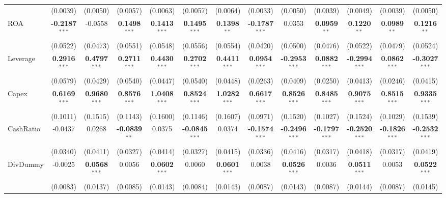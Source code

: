 \documentclass[11pt,a4paper]{article}
\begin{document}
\begin{table}[htbp]
\begin{tabular}{lcccccccccccc}
 & (0.0039) & (0.0050) & (0.0057) & (0.0063) & (0.0057) & (0.0064) & (0.0033) & (0.0050) & (0.0039) & (0.0049) & (0.0039) & (0.0050) \\
ROA & \textbf{-0.2187}$^{***}$ & -0.0558 & \textbf{0.1498}$^{***}$ & \textbf{0.1413}$^{***}$ & \textbf{0.1495}$^{***}$ & \textbf{0.1398}$^{**}$ & \textbf{-0.1787}$^{***}$ & 0.0353 & \textbf{0.0959}$^{**}$ & \textbf{0.1220}$^{**}$ & \textbf{0.0989}$^{**}$ & \textbf{0.1216}$^{**}$ \\
 & (0.0522) & (0.0473) & (0.0551) & (0.0548) & (0.0556) & (0.0554) & (0.0420) & (0.0500) & (0.0476) & (0.0522) & (0.0479) & (0.0524) \\
Leverage & \textbf{0.2916}$^{***}$ & \textbf{0.4797}$^{***}$ & \textbf{0.2711}$^{***}$ & \textbf{0.4430}$^{***}$ & \textbf{0.2702}$^{***}$ & \textbf{0.4411}$^{***}$ & \textbf{0.0954}$^{***}$ & \textbf{-0.2953}$^{***}$ & \textbf{0.0882}$^{***}$ & \textbf{-0.2994}$^{***}$ & \textbf{0.0862}$^{***}$ & \textbf{-0.3027}$^{***}$ \\
 & (0.0579) & (0.0429) & (0.0540) & (0.0447) & (0.0540) & (0.0448) & (0.0263) & (0.0409) & (0.0250) & (0.0413) & (0.0246) & (0.0415) \\
Capex & \textbf{0.6169}$^{***}$ & \textbf{0.9680}$^{***}$ & \textbf{0.8576}$^{***}$ & \textbf{1.0408}$^{***}$ & \textbf{0.8524}$^{***}$ & \textbf{1.0282}$^{***}$ & \textbf{0.6617}$^{***}$ & \textbf{0.8526}$^{***}$ & \textbf{0.8485}$^{***}$ & \textbf{0.9075}$^{***}$ & \textbf{0.8515}$^{***}$ & \textbf{0.9335}$^{***}$ \\
 & (0.1011) & (0.1515) & (0.1143) & (0.1600) & (0.1146) & (0.1607) & (0.0971) & (0.1520) & (0.1027) & (0.1524) & (0.1029) & (0.1539) \\
CashRatio & -0.0437 & 0.0268 & \textbf{-0.0839}$^{**}$ & 0.0375 & \textbf{-0.0845}$^{***}$ & 0.0374 & \textbf{-0.1574}$^{***}$ & \textbf{-0.2496}$^{***}$ & \textbf{-0.1797}$^{***}$ & \textbf{-0.2520}$^{***}$ & \textbf{-0.1826}$^{***}$ & \textbf{-0.2532}$^{***}$ \\
 & (0.0340) & (0.0411) & (0.0327) & (0.0414) & (0.0327) & (0.0415) & (0.0336) & (0.0416) & (0.0317) & (0.0418) & (0.0317) & (0.0419) \\
DivDummy & -0.0025 & \textbf{0.0568}$^{***}$ & 0.0056 & \textbf{0.0602}$^{***}$ & 0.0060 & \textbf{0.0601}$^{***}$ & 0.0038 & \textbf{0.0526}$^{***}$ & 0.0036 & \textbf{0.0511}$^{***}$ & 0.0053 & \textbf{0.0522}$^{***}$ \\
 & (0.0083) & (0.0137) & (0.0085) & (0.0143) & (0.0084) & (0.0143) & (0.0087) & (0.0143) & (0.0087) & (0.0144) & (0.0087) & (0.0145) \\

\end{tabular}
\end{table}
\end{document}
